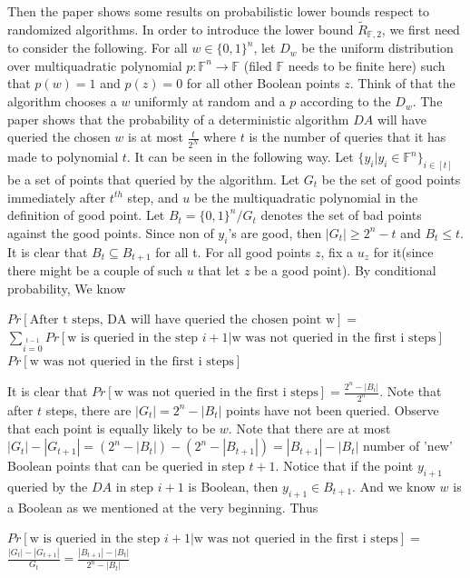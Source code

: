 \documentclass{article}
\begin{document}
  Then the paper shows some results on probabilistic lower bounds respect to randomized algorithms. In order to introduce the lower bound $\tilde{R}_{\mathbb{F},2}$, we  first need to consider the following. For all $w\in\{0,1\}^n$, let $D_w$ be the uniform distribution over multiquadratic polynomial $p: \mathbb{F}^n \rightarrow \mathbb{F}$ (filed $\mathbb{F}$ needs to be finite here) such that $p(w)= 1$ and $p(z)=0$ for all other Boolean points $z$. Think of that the algorithm chooses a $w$ uniformly at random and a $p$ according to the $D_w$. The paper shows that the probability of a deterministic algorithm $DA$ will have queried the chosen $w$ is at most $\frac{t}{2^N}$ where $t$ is the number of queries that it has made to polynomial $t$. It can be seen in the following way. Let $\{y_i | y_i\in \mathbb{F}^n\}_{i\in[t]}$ be a set of points that queried by the algorithm. Let $G_t$ be the set of good points immediately after $t^{th}$ step, and $u$ be the  multiquadratic polynomial in the definition of good point. Let $B_t = \{0,1\}^n / G_t $ denotes the set of bad points against the good points. Since non of $y_i$'s are good, then $|G_t| \ge 2^n - t$ and $B_t \le t$. It is clear that $B_t \subseteq B_{t+1}$ for all t. For all good points $z$, fix a $u_z$ for it(since there might be a couple of such $u$ that let $z$ be a good point). By conditional probability, We know 
 
 \begin{center}
     $Pr[\text{After t steps, DA will have queried the chosen point w}] = $ $ \sum\limits_{i=0}\limits^{t-1} Pr[ \text{w is queried in the step } i+1 | \text{w was not queried in the first i steps}] $ $ Pr[\text{w was not queried in the first i steps}]$     
 \end{center} 
 
 It is clear that $Pr[\text{w was not queried in the first i steps}] = \frac{2^n - |B_i|}{2^n}$. Note that after $t$ steps, there are $|G_t| = 2^n - |B_t|$ points have not been queried. Observe that each point is equally likely to be $w$. Note that there are at most $|G_t| - |G_{t+1}| =  (2^n - |B_t|) - (2^n-|B_{t+1}|) = |B_{t+1}| - |B_t|$ number of 'new' Boolean points that can be queried in step $t+1$. Notice that if the point $y_{i+1}$ queried by the $DA$ in step $i+1$ is Boolean, then $y_{i+1} \in B_{t+1}$. And we know $w$ is a Boolean as we mentioned at the very beginning. Thus
 
 \begin{center}
     $Pr[ \text{w is queried in the step } i+1 | \text{w was not queried in the first i steps}] = $ $\frac{|G_t|-|G_{t+1}|}{G_t} = \frac{|B_{t+1}| - |B_t|}{2^n - |B_t|}$ 
 \end{center}
 
\end{document}
